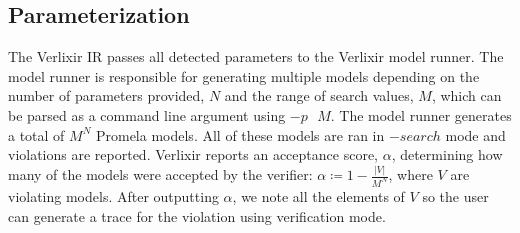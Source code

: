 \subsection{Parameterization}
The Verlixir IR passes all detected parameters to the Verlixir model runner. The model runner is responsible for generating multiple models depending on the number of parameters provided, $N$ and the range of search values, $M$, which can be parsed as a command line argument using $-p\text{ }M$. The model runner generates a total of $M^N$ Promela models. All of these models are ran in $-search$ mode and violations are reported. Verlixir reports an acceptance score, $\alpha$, determining how many of the models were accepted by the verifier: $\alpha \coloneq 1 - \frac{|V|}{M^N}$, where $V$ are violating models. After outputting $\alpha$, we note all the elements of $V$ so the user can generate a trace for the violation using verification mode.

